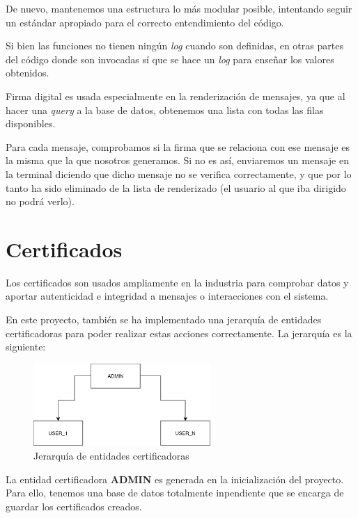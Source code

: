 \documentclass[a4paper,11pt]{article}
\begin{document}
De nuevo, mantenemos una estructura lo más modular posible, intentando seguir un estándar apropiado para el correcto entendimiento del código. 

Si bien las funciones no tienen ningún \textit{log} cuando son definidas, en otras partes del código donde son invocadas sí que se hace un \textit{log} para enseñar los valores obtenidos.

Firma digital es usada especialmente en la renderización de mensajes, ya que al hacer una \textit{query} a la base de datos, obtenemos una lista con todas las filas disponibles. 

Para cada mensaje, comprobamos si la firma que se relaciona con ese mensaje es la misma que la que nosotros generamos. Si no es así, enviaremos un mensaje en la terminal diciendo que dicho mensaje no se verifica correctamente, y que por lo tanto ha sido eliminado de la lista de renderizado (el usuario al que iba dirigido no podrá verlo).

\section{Certificados}
\label{sec:certificados}

Los certificados son usados ampliamente en la industria para comprobar datos y aportar autenticidad e integridad a mensajes o interacciones con el sistema.

En este proyecto, también se ha implementado una jerarquía de entidades certificadoras para poder realizar estas acciones correctamente. La jerarquía es la siguiente:

\begin{figure}[h]
    \centering
    \includegraphics[width=0.6\textwidth]{./images/certificatesStructure.png}
    \caption{Jerarquía de entidades certificadoras}
    \label{fig:jerarquia}
\end{figure}

La entidad certificadora \textbf{ADMIN} es generada en la inicialización del proyecto. Para ello, tenemos una base de datos totalmente inpendiente que se encarga de guardar los certificados creados.
\end{document}
